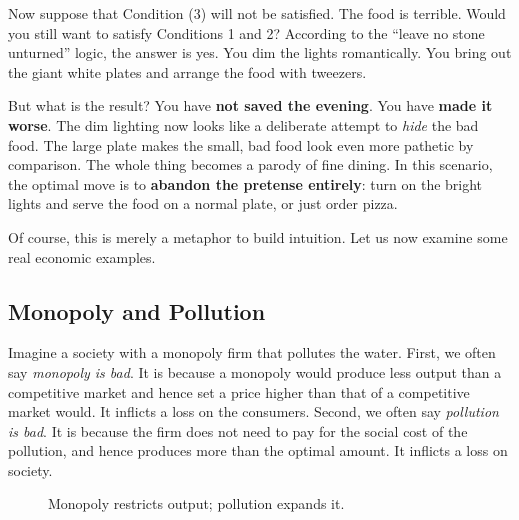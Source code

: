 \documentclass[11pt]{article}
\begin{document}
Now suppose that Condition (3) will not be satisfied. The food is terrible. Would you still want to satisfy Conditions 1 and 2? According to the ``leave no stone unturned'' logic, the answer is yes. You dim the lights romantically. You bring out the giant white plates and arrange the food with tweezers.

But what is the result? You have \textbf{not saved the evening}. You have \textbf{made it worse}. The dim lighting now looks like a deliberate attempt to \textit{hide} the bad food. The large plate makes the small, bad food look even more pathetic by comparison. The whole thing becomes a parody of fine dining. In this scenario, the optimal move is to \textbf{abandon the pretense entirely}: turn on the bright lights and serve the food on a normal plate, or just order pizza.

Of course, this is merely a metaphor to build intuition. Let us now examine some real economic examples.

\subsection{Monopoly and Pollution}

Imagine a society with a monopoly firm that pollutes the water. First, we often say \textit{monopoly is bad}. It is because a monopoly would produce less output than a competitive market and hence set a price higher than that of a competitive market would. It inflicts a loss on the consumers. Second, we often say \textit{pollution is bad}. It is because the firm does not need to pay for the social cost of the pollution, and hence produces more than the optimal amount. It inflicts a loss on society.

\begin{figure}[ht]
\centering
{}
\caption{Monopoly restricts output; pollution expands it.}
\label{fig:monopoly}
\end{figure}
\end{document}
